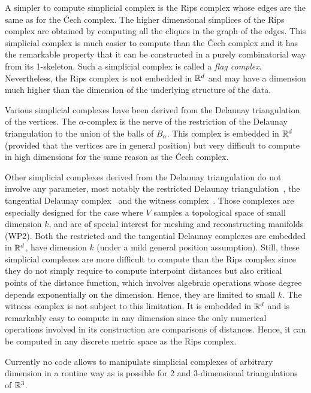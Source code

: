 A simpler to compute simplicial complex is the Rips complex whose edges are the same as for the \v{C}ech complex. The higher dimensional simplices of the Rips complex are obtained by computing all the cliques in the graph of the edges. This simplicial complex is much easier to compute than the \v{C}ech complex and it has the remarkable property that it can be constructed in a purely combinatorial way from its 1-skeleton.  Such a simplicial complex is called a {\em flag
  complex}. Nevertheless, the Rips complex is not embedded in $\mathbb R ^d$
and may have a dimension much higher than the dimension of the underlying structure
of the data.


Various simplicial complexes have been derived from the Delaunay
triangulation of the vertices. The $\alpha$-complex is the nerve of
the restriction of the Delaunay triangulation to the union of the
balls of $B_{\alpha}$. This complex is embedded in $\mathbb R^d$ (provided
that the vertices are in general position) but very difficult to
compute in high dimensions for the same reason as the \v{C}ech complex.

Other simplicial complexes derived from the Delaunay triangulation do not involve any parameter, most notably the restricted Delaunay triangulation~\cite{he-gtmg-2001}, the tangential Delaunay complex~\cite{geometrica-7142i} and the witness complex~\cite{cds-tewc-2004}. Those complexes are especially designed for the case where $V$ samples a topological space of small dimension $k$, and are of special interest for meshing and reconstructing manifolds (WP2). Both the restricted and the tangential Delaunay complexes are embedded in $\mathbb R^d$, have dimension $k$ (under a mild general position assumption). Still, these simplicial complexes are more difficult to compute 
than the Rips complex since they do not simply require to compute interpoint distances but also  critical points of the distance function, which involves algebraic operations whose degree depends exponentially on the dimension. Hence, they are  limited to small $k$.
The witness complex is not subject to this limitation. It is embedded in $\mathbb R ^d$ and is remarkably easy to compute in any dimension since the only numerical operations involved in its construction are comparisons of distances. Hence, it can be computed in any discrete metric space as the Rips complex.

 Currently no code allows to manipulate simplicial complexes of arbitrary dimension in a routine way as is possible for 2 and 3-dimensional triangulations of $\mathbb R ^3$.

